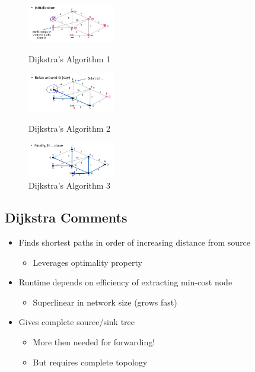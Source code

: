 \documentclass[12pt]{ctexart}   %
\begin{document}
\begin{itemize}
		\begin{figure}
			\begin{minipage}[t]{0.3\linewidth}
				\centering
				\includegraphics[width=1.5in]{images/5-3-1}
				\caption{ Dijkstra's Algorithm 1 }
				\label{fig:5-3-1}
			\end{minipage}
			\begin{minipage}[t]{0.3\linewidth}
				\centering
				\includegraphics[width=1.5in]{images/5-3-2}
				\caption{Dijkstra's Algorithm  2}
				\label{fig:5-3-2}
			\end{minipage}
			\begin{minipage}[t]{0.3\linewidth}
				\centering
				\includegraphics[width=1.5in]{images/5-3-3}
				\caption{Dijkstra's Algorithm  3}
				\label{fig:5-3-3}
			\end{minipage}
		\end{figure}
	\end{itemize}
	
	\subsection{Dijkstra Comments}
	\begin{itemize}
		\item Finds shortest paths in order of increasing distance from source
		\begin{itemize}
			\item Leverages optimality property
		\end{itemize}
		
		\item Runtime depends on efficiency of extracting min-cost node
		\begin{itemize}
			\item Superlinear in network size (grows fast)
		\end{itemize}
		
		\item Gives complete source/sink tree
		\begin{itemize}
			\item More then needed for forwarding!
			\item But requires complete topology
		\end{itemize}
	\end{itemize}
\end{document}
